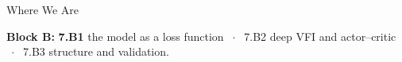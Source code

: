 

\graphicspath{{./figures/}}

\newcommand{\repo}[2]{\href{https://github.com/vonzhg/Macro-2026Fall/blob/main/#1}{\texttt{#2}}}





\makedecktitle

\begin{frame}{Where We Are}
\vspace{-1mm}
\begin{center}
\small \textbf{Block B:} \textbf{7.B1} the model as a loss function $\;\cdot\;$ 7.B2 deep VFI and actor--critic $\;\cdot\;$ 7.B3 structure and validation.
\end{center}
\end{frame}

